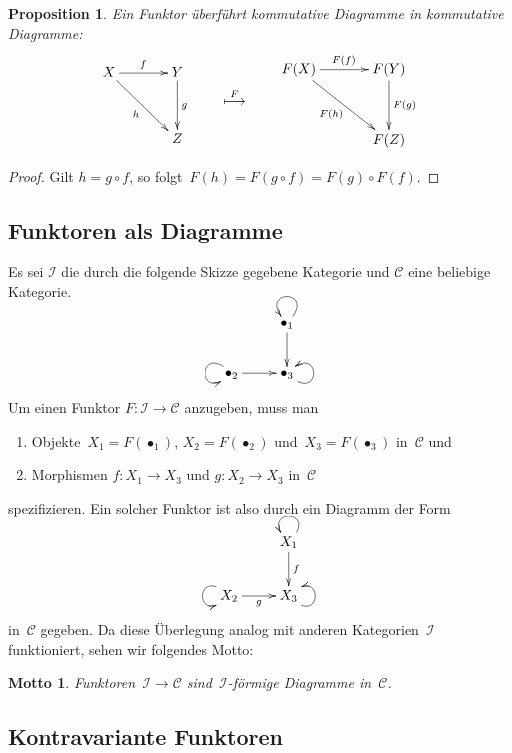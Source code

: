 \documentclass[a4paper,ngerman]{scrartcl}
\theoremstyle{definition}
\theoremstyle{plain}
\newtheorem{prop}[defn]{Proposition}
\newtheorem{motto}[defn]{Motto}
\theoremstyle{remark}
\newcommand{\I}{\mathcal{I}}
\newcommand{\C}{\mathcal{C}}
\begin{document}
\begin{prop}
Ein Funktor überführt kommutative Diagramme in kommutative Diagramme:
\[ \vcenter{ \xymatrix@=8ex{
  X \ar[r]^{f} \ar[rd]_{h} & Y \ar[d]^{g} \\
  & Z
} }
\qquad \overset{F}{\longmapsto} \qquad
\vcenter{ \xymatrix@=8ex{
  F(X) \ar[r]^{F(f)} \ar[rd]_{F(h)} & F(Y) \ar[d]^{F(g)} \\
  & F(Z)
} } \]
\end{prop}
\begin{proof}
Gilt $h = g \circ f$, so folgt~$F(h) = F(g \circ f) = F(g) \circ F(f)$.
\end{proof}


\subsection{Funktoren als Diagramme}

Es sei $\I$ die durch die folgende Skizze gegebene Kategorie und $\C$ eine beliebige Kategorie.

\[ \xymatrix{
  & \bullet_1 \ar[d] \ar@(ur,ul) \\
  \bullet_2 \ar[r] \ar@(ul,dl) & \bullet_3 \ar@(dr,ur)
} \]

Um einen Funktor $F : \I \to \C$ anzugeben, muss man
\begin{enumerate}
  \item Objekte~$X_1 = F(\bullet_1)$, $X_2 = F(\bullet_2)$ und~$X_3 =
  F(\bullet_3)$ in~$\C$ und
  \item Morphismen $f:X_1 \to X_3$ und $g:X_2 \to X_3$ in~$\C$
\end{enumerate}
spezifizieren. Ein solcher Funktor ist also durch ein Diagramm der Form

\[ \xymatrix{
  & X_1 \ar[d]^f \ar@(ur,ul) \\
  X_2 \ar[r]_g \ar@(ul,dl) & X_3 \ar@(dr,ur)
} \]
in~$\C$ gegeben. Da diese Überlegung analog mit anderen Kategorien~$\I$
funktioniert, sehen wir folgendes Motto:
\begin{motto}Funktoren~$\I \to \C$ sind~$\I$-förmige Diagramme
in~$\C$.\end{motto}



\subsection{Kontravariante Funktoren}
\end{document}

